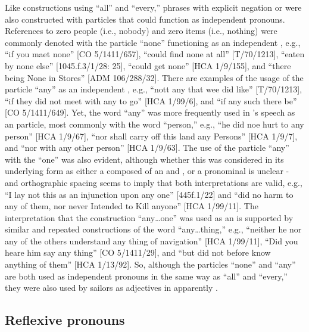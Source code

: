 Like constructions using “all” and “every,” phrases with explicit negation or  were also constructed with  particles that could function as independent pronouns. References to zero people (i.e., nobody) and zero items (i.e., nothing) were commonly denoted with the particle “none” functioning as an independent , e.g., “if you maet none” [CO 5/1411/657], “could find none at all” [T/70/1213], “eaten by none else” [1045.f.3/1/28: 25], “could get none” [HCA 1/9/155], and “there being None in Stores” [ADM 106/288/32]. There are examples of the usage of the particle “any” as an independent , e.g., “nott any that wee did like” [T/70/1213], “if they did not meet with any to go” [HCA 1/99/6], and “if any such there be” [CO 5/1411/649]. Yet, the word “any” was more frequently used in ’s speech as an  particle, most commonly with the word “person,” e.g., “he did noe hurt to any person” [HCA 1/9/67], “nor shall carry off this land any Persons” [HCA 1/9/7], and “nor with any other person” [HCA 1/9/63]. The use of the particle “any” with the  “one” was also evident, although whether this was considered in its underlying form as either a  composed of an  and , or a pronominal  is unclear - and orthographic spacing seems to imply that both interpretations are valid, e.g., “I lay not this as an injunction upon any one” [445f.1/22] and “did no harm to any of them, nor never Intended to Kill anyone” [HCA 1/99/11]. The interpretation that the construction “any…one” was used as an   is supported by similar and repeated constructions of the word “any…thing,” e.g., “neither he nor any of the others understand any thing of navigation” [HCA 1/99/11], “Did you heare him say any thing” [CO 5/1411/29], and “but did not before know anything of them” [HCA 1/13/92]. So, although the particles “none” and “any” are both used as independent pronouns in the same way as “all” and “every,” they were also used by sailors as  adjectives in apparently .

\subsection{{Reflexive pronouns}}%


